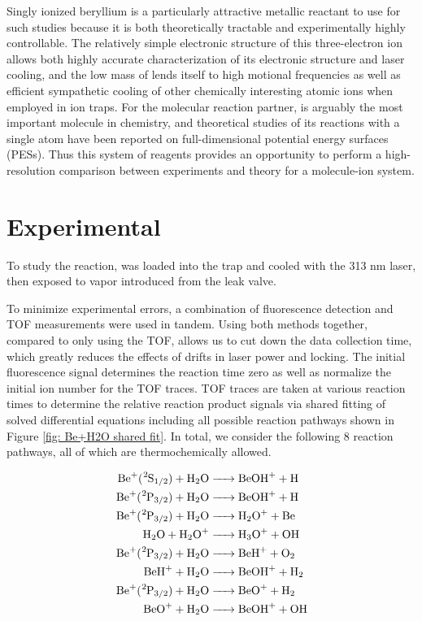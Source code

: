 Singly ionized beryllium is a particularly attractive metallic reactant to use for such studies because it is both theoretically tractable and experimentally highly controllable. The relatively simple electronic structure of this three-electron ion allows both highly accurate characterization of its electronic structure and laser cooling,\cite{Bollinger1985} and the low mass of  lends itself to high motional frequencies as well as efficient sympathetic cooling of other chemically interesting atomic ions when employed in ion traps.\cite{Chen2014a,Roth2006,Larson1986,Schowalter2016} For the molecular reaction partner,  is arguably the most important molecule in chemistry, and theoretical studies of its reactions with a single atom have been reported on full-dimensional potential energy surfaces (PESs).\cite{Li2013,Song2015,Ray2017,Li2015,Xiao2011} Thus this system of reagents provides an opportunity to perform a high-resolution comparison between experiments and theory for a molecule-ion system.

\section{Experimental}

To study the  reaction,  was loaded into the trap and cooled with the 313 nm laser, then exposed to  vapor introduced from the leak valve.

To minimize experimental errors, a combination of fluorescence detection and TOF measurements were used in tandem. Using both methods together, compared to only using the TOF, allows us to cut down the data collection time, which greatly reduces the effects of drifts in laser power and locking. The initial fluorescence signal determines the reaction time zero as well as normalize the initial ion number for the TOF traces. TOF traces are taken at various reaction times to determine the relative reaction product signals via shared fitting of solved differential equations including all possible reaction pathways shown in Figure \ref{fig: Be+H2O shared fit}. In total, we consider the following 8 reaction pathways, all of which are thermochemically allowed.

\begin{align}
	\ce{Be+(^2S1/2) + H2O & -> BeOH+ + H} \label{r: Be(S)+H2O->BeOH} \\
	\ce{Be+(^2P3/2) + H2O & -> BeOH+ + H} \label{r: Be(P)+H2O->BeOH} \\
	\ce{Be+(^2P3/2) + H2O & -> H2O+ + Be} \label{r: Be(P)+H2O->H2O} \\
	\ce{H2O + H2O+ & -> H3O+ + OH} \label{r: H2O+H2O->H3O} \\
	\ce{Be+(^2P3/2) + H2O & -> BeH+ + O2} \label{r: Be(P)+H2O->BeH} \\
	\ce{BeH+ + H2O & -> BeOH+ + H2} \label{r: BeH+H2O->BeOH} \\
	\ce{Be+(^2P3/2) + H2O & -> BeO+ + H2} \label{r: Be(P)+H2O->BeO} \\
	\ce{BeO+ + H2O & -> BeOH+ + OH} \label{r: BeO+H2O->BeOH}
\end{align}

